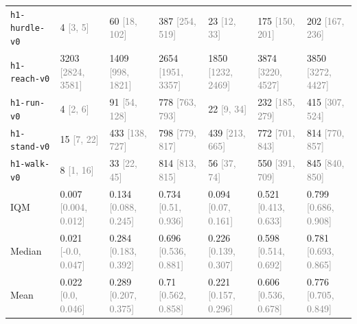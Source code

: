 \begin{tabular}{lllllll}
\texttt{h1-hurdle-v0} & 4 \textcolor{gray}{[3, 5]} & 60 \textcolor{gray}{[18, 102]} & 387 \textcolor{gray}{[254, 519]} & 23 \textcolor{gray}{[12, 33]} & 175 \textcolor{gray}{[150, 201]} & 202 \textcolor{gray}{[167, 236]} \\
\texttt{h1-reach-v0} & 3203 \textcolor{gray}{[2824, 3581]} & 1409 \textcolor{gray}{[998, 1821]} & 2654 \textcolor{gray}{[1951, 3357]} & 1850 \textcolor{gray}{[1232, 2469]} & 3874 \textcolor{gray}{[3220, 4527]} & 3850 \textcolor{gray}{[3272, 4427]} \\
\texttt{h1-run-v0} & 4 \textcolor{gray}{[2, 6]} & 91 \textcolor{gray}{[54, 128]} & 778 \textcolor{gray}{[763, 793]} & 22 \textcolor{gray}{[9, 34]} & 232 \textcolor{gray}{[185, 279]} & 415 \textcolor{gray}{[307, 524]} \\
\texttt{h1-stand-v0} & 15 \textcolor{gray}{[7, 22]} & 433 \textcolor{gray}{[138, 727]} & 798 \textcolor{gray}{[779, 817]} & 439 \textcolor{gray}{[213, 665]} & 772 \textcolor{gray}{[701, 843]} & 814 \textcolor{gray}{[770, 857]} \\
\texttt{h1-walk-v0} & 8 \textcolor{gray}{[1, 16]} & 33 \textcolor{gray}{[22, 45]} & 814 \textcolor{gray}{[813, 815]} & 56 \textcolor{gray}{[37, 74]} & 550 \textcolor{gray}{[391, 709]} & 845 \textcolor{gray}{[840, 850]} \\
IQM & 0.007 \textcolor{gray}{[0.004, 0.012]} & 0.134 \textcolor{gray}{[0.088, 0.245]} & 0.734 \textcolor{gray}{[0.51, 0.936]} & 0.094 \textcolor{gray}{[0.07, 0.161]} & 0.521 \textcolor{gray}{[0.413, 0.633]} & 0.799 \textcolor{gray}{[0.686, 0.908]} \\
Median & 0.021 \textcolor{gray}{[-0.0, 0.047]} & 0.284 \textcolor{gray}{[0.183, 0.392]} & 0.696 \textcolor{gray}{[0.536, 0.881]} & 0.226 \textcolor{gray}{[0.139, 0.307]} & 0.598 \textcolor{gray}{[0.514, 0.692]} & 0.781 \textcolor{gray}{[0.693, 0.865]} \\
Mean & 0.022 \textcolor{gray}{[0.0, 0.046]} & 0.289 \textcolor{gray}{[0.207, 0.375]} & 0.71 \textcolor{gray}{[0.562, 0.858]} & 0.221 \textcolor{gray}{[0.157, 0.296]} & 0.606 \textcolor{gray}{[0.536, 0.678]} & 0.776 \textcolor{gray}{[0.705, 0.849]} \\
\bottomrule
\end{tabular}
